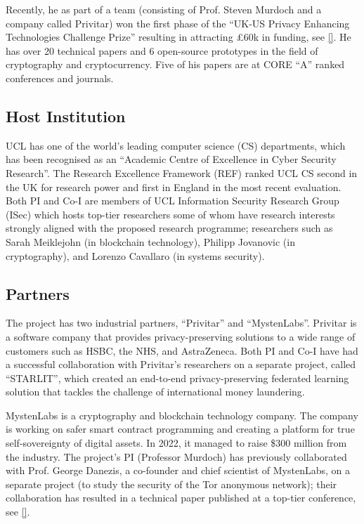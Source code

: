 Recently, he as part of a team (consisting of Prof. Steven Murdoch and a company called Privitar) won the first phase of the “UK-US Privacy Enhancing Technologies Challenge Prize” resulting in attracting £60k in funding, see \href{https://www.ucl.ac.uk/computer-science/news/2022/dec/ucl-computer-sciences-success-privacy-enhancing-technologies-challenge}{[\x]}.  He has over 20 technical papers and 6 open-source prototypes in the field of cryptography and cryptocurrency. Five of his papers are at CORE “A” ranked conferences and journals.


\subsection{Host Institution}
UCL has one of the world's leading computer science (CS) departments, which has been recognised as an “Academic Centre of Excellence in Cyber Security Research”. The Research Excellence Framework (REF) ranked UCL CS second in the UK for research power and first in England in the most recent evaluation. Both PI and Co-I are members of UCL Information Security Research Group (ISec) which hosts top-tier researchers some of whom have research interests strongly aligned with the proposed research programme; researchers such as  Sarah Meiklejohn  (in blockchain technology), Philipp Jovanovic (in cryptography), and Lorenzo Cavallaro (in systems security). 


\subsection{Partners}
The project has two industrial partners, ``Privitar'' and ``MystenLabs''. Privitar is a software company that provides privacy-preserving solutions to a wide range of customers such as HSBC, the NHS, and AstraZeneca. Both PI and Co-I have had a successful collaboration with Privitar's researchers on a separate project, called ``STARLIT'', which created an end-to-end privacy-preserving federated learning solution that tackles the challenge of international money laundering. 

MystenLabs is a cryptography and blockchain technology company. The company is working on safer smart contract programming and creating a platform for true self-sovereignty of digital assets. In 2022, it managed to raise \$300 million from the industry. The project's PI (Professor Murdoch) has previously collaborated with 
Prof. George Danezis, a co-founder and chief scientist of MystenLabs, on a separate project (to study the security of the Tor anonymous network); their collaboration has resulted in a technical paper published at a top-tier conference, see \href{https://ieeexplore.ieee.org/stamp/stamp.jsp?tp=&arnumber=1425067}{[\x]}.  

